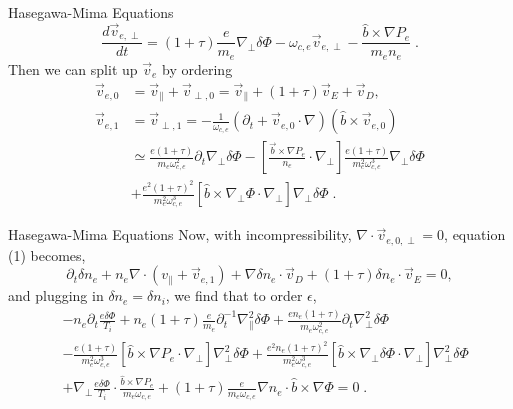\documentclass[aspectratio=43]{beamer}
\begin{document}
   \begin{frame}{Hasegawa-Mima Equations}
      \begin{equation}
         \frac{d\vec{v}_{e,\perp}}{dt} = (1+\tau)\frac{e}{m_e}\nabla_{\perp}\delta\Phi - \omega_{c,e}\vec{v}_{e,\perp}-\frac{\hat{b}\times\nabla P_e}{m_en_e}\;.
      \end{equation}
      \quad Then we can split up $\vec{v}_e$ by ordering
      \begin{equation}
      \begin{aligned}
         \vec{v}_{e,0} &= \vec{v}_{\parallel} + \vec{v}_{\perp,0} = \vec{v}_{\parallel} + \left(1 + \tau\right)\vec{v}_E + \vec{v}_D,  \\
         \vec{v}_{e,1} &= \vec{v}_{\perp,1} = -\frac{1}{\omega_{c,e}}(\partial_t+\vec{v}_{e,0}\cdot\nabla)(\hat{b}\times\vec{v}_{e,0}) \\
                       &\simeq \frac{e(1+\tau)}{m_e\omega_{c,e}^2}\partial_t\nabla_{\perp}\delta\Phi - [\frac{\vec{b}\times\nabla P_e}{n_e}\cdot\nabla_{\perp}]
                               \frac{e(1+\tau)}{m_e^2\omega_{c,e}^3}\nabla_{\perp}\delta\Phi \\
                       &+      \frac{e^2(1+\tau)^2}{m_e^2\omega_{c,e}^3}[\hat{b}\times\nabla_{\perp}\Phi\cdot\nabla_{\perp}]\nabla_{\perp}\delta\Phi\;.
      \end{aligned}
      \end{equation}
   \end{frame}

   \begin{frame}{Hasegawa-Mima Equations}
      \quad Now, with incompressibility, $\nabla\cdot\vec{v}_{e,0,\perp}=0$, equation (1) becomes,
      \begin{equation}
         \partial_t\delta n_e+n_e\nabla\cdot(v_{\parallel} + \vec{v}_{e,1}) + \nabla\delta n_e\cdot\vec{v}_D+(1+\tau)\delta n_e\cdot\vec{v}_E = 0,
      \end{equation}
      and plugging in $\delta n_e=\delta n_i$, we find that to order $\epsilon$,
      \begin{equation}
      \begin{aligned}
         &-n_e\partial_t\frac{e\delta\Phi}{T_i} + n_e(1+\tau)\frac{e}{m_e}\partial_t^{-1}\nabla_{\parallel}^2\delta\Phi
         + \frac{en_e(1+\tau)}{m_e\omega_{c,e}^2}\partial_t\nabla_{\perp}^2\delta\Phi \\
         &- \frac{e(1+\tau)}{m_e^2\omega_{c,e}^3}[\hat{b}\times\nabla P_e\cdot\nabla_{\perp}]\nabla_{\perp}^2\delta\Phi
         + \frac{e^2n_e(1+\tau)^2}{m_e^2\omega_{c,e}^3}[\hat{b}\times\nabla_{\perp}\delta\Phi\cdot\nabla_{\perp}]\nabla_{\perp}^2\delta\Phi \\
         &+ \nabla_{\perp}\frac{e\delta\Phi}{T_i}\cdot\frac{\hat{b}\times\nabla P_e}{m_e\omega_{c,e}} + (1+\tau)\frac{e}{m_e\omega_{c,e}}\nabla n_e\cdot\hat{b}\times\nabla\Phi = 0\;.
      \end{aligned}
      \end{equation}
   \end{frame}
\end{document}
